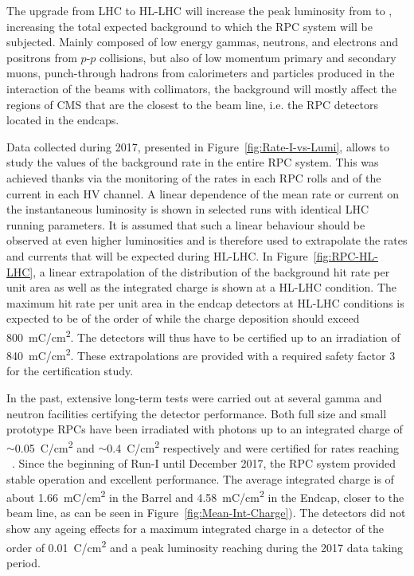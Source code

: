 	The upgrade from LHC to HL-LHC will increase the peak luminosity from  \siflux to  \siflux, increasing the total expected background to which the RPC system will be subjected. Mainly composed of low energy gammas, neutrons, and electrons and positrons from $p$-$p$ collisions, but also of low momentum primary and secondary muons, punch-through hadrons from calorimeters and particles produced in the interaction of the beams with collimators, the background will mostly affect the regions of CMS that are the closest to the beam line, i.e. the RPC detectors located in the endcaps.

	Data collected during 2017, presented in Figure~\ref{fig:Rate-I-vs-Lumi}, allows to study the values of the background rate in the entire RPC system. This was achieved thanks via the monitoring of the rates in each RPC rolls and of the current in each HV channel. A linear dependence of the mean rate or current on the instantaneous luminosity is shown in selected runs with identical LHC running parameters. It is assumed that such a linear behaviour should be observed at even higher luminosities and is therefore used to extrapolate the rates and currents that will be expected during HL-LHC. In Figure~\ref{fig:RPC-HL-LHC}, a linear extrapolation of the distribution of the background hit rate per unit area as well as the integrated charge is shown at a HL-LHC condition. The maximum hit rate per unit area in the endcap detectors at HL-LHC conditions is expected to be of the order of  while the charge deposition should exceed \SI{800}{mC/cm^2}. The detectors will thus have to be certified up to an irradiation of \SI{840}{mC/cm^2}. These extrapolations are provided with a required safety factor 3 for the certification study.

	In the past, extensive long-term tests were carried out at several gamma and neutron facilities certifying the detector performance. Both full size and small prototype RPCs have been irradiated with photons up to an integrated charge of $\sim$\SI{0.05}{C/cm^2} and $\sim$\SI{0.4}{C/cm^2} respectively and were certified for rates reaching ~\cite{GIF2004,AGING2009}. Since the beginning of Run-I until December 2017, the RPC system provided stable operation and excellent performance. The average integrated charge is of about \SI{1.66}{mC/cm^2} in the Barrel and \SI{4.58}{mC/cm^2} in the Endcap, closer to the beam line, as can be seen in Figure~\ref{fig:Mean-Int-Charge}). The detectors did not show any ageing effects for a maximum integrated charge in a detector of the order of \SI{0.01}{C/cm^2} and a peak luminosity reaching  \siflux during the 2017 data taking period.

